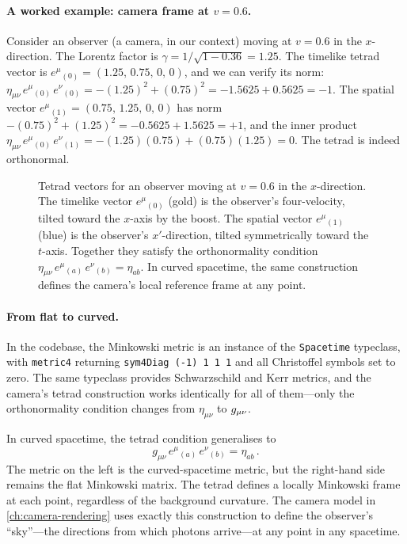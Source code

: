 \paragraph{A worked example: camera frame at $v = 0.6$.}

Consider an observer (a camera, in our context) moving at $v = 0.6$ in the
$x$-direction.  The Lorentz factor is $\gamma = 1/\sqrt{1 - 0.36} = 1.25$.
The timelike tetrad vector is
$e^\mu{}_{(0)} = (1.25,\, 0.75,\, 0,\, 0)$,
and we can verify its norm:
$\eta_{\mu\nu}\,e^\mu{}_{(0)}\,e^\nu{}_{(0)} = -(1.25)^2 + (0.75)^2 =
-1.5625 + 0.5625 = -1$.  The spatial vector
$e^\mu{}_{(1)} = (0.75,\, 1.25,\, 0,\, 0)$ has norm
$-(0.75)^2 + (1.25)^2 = -0.5625 + 1.5625 = +1$, and the inner product
$\eta_{\mu\nu}\,e^\mu{}_{(0)}\,e^\nu{}_{(1)} = -(1.25)(0.75) + (0.75)(1.25)
= 0$.  The tetrad is indeed orthonormal.

\begin{figure}[htbp]
  \centering
  
  \caption[Boosted tetrad vectors]{Tetrad vectors for an observer moving at $v = 0.6$ in the
    $x$-direction.  The timelike vector $e^\mu{}_{(0)}$ (gold) is the
    observer's four-velocity, tilted toward the $x$-axis by the boost.  The
    spatial vector $e^\mu{}_{(1)}$ (blue) is the observer's $x'$-direction,
    tilted symmetrically toward the $t$-axis.  Together they satisfy the
    orthonormality condition
    $\eta_{\mu\nu}\,e^\mu{}_{(a)}\,e^\nu{}_{(b)} = \eta_{ab}$.  In curved
    spacetime, the same construction defines the camera's local reference
    frame at any point.}
  \label{fig:boosted-tetrad}
\end{figure}

\paragraph{From flat to curved.}

In the codebase, the Minkowski metric is an instance of the \texttt{Spacetime}
typeclass, with \texttt{metric4} returning \texttt{sym4Diag (-1) 1 1 1} and all
Christoffel symbols set to zero.  The same typeclass provides Schwarzschild and
Kerr metrics, and the camera's tetrad construction works identically for all of
them---only the orthonormality condition changes from $\eta_{\mu\nu}$ to
$g_{\mu\nu}$.

In curved spacetime, the tetrad condition generalises to
%
\begin{equation}
  g_{\mu\nu}\,e^\mu{}_{(a)}\,e^\nu{}_{(b)} = \eta_{ab} \,.
  \label{eq:tetrad-curved}
\end{equation}
%
The metric on the left is the curved-spacetime metric, but the right-hand side
remains the flat Minkowski matrix.  The tetrad defines a locally Minkowski frame
at each point, regardless of the background curvature.  The camera model in
\cref{ch:camera-rendering} uses exactly this construction to define the
observer's ``sky''---the directions from which photons arrive---at any point in
any spacetime.
